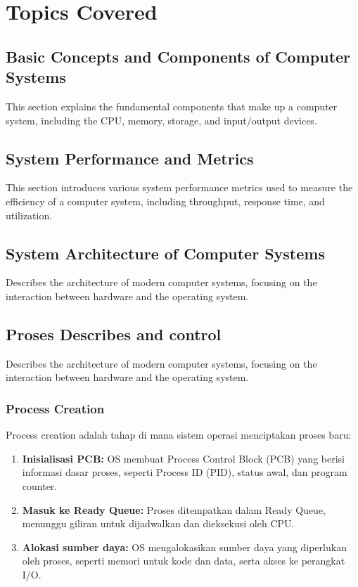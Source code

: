 \documentclass[12pt]{article}
\begin{document}
\section{Topics Covered}

\subsection{Basic Concepts and Components of Computer Systems}
This section explains the fundamental components that make up a computer system, including the CPU, memory, storage, and input/output devices.

\subsection{System Performance and Metrics}
This section introduces various system performance metrics used to measure the efficiency of a computer system, including throughput, response time, and utilization.

\subsection{System Architecture of Computer Systems}
Describes the architecture of modern computer systems, focusing on the interaction between hardware and the operating system.

\subsection{Proses Describes and control}
Describes the architecture of modern computer systems, focusing on the interaction between hardware and the operating system.

\subsubsection{Process Creation}
Process creation adalah tahap di mana sistem operasi menciptakan proses baru:
\begin{enumerate}
    \item \textbf{Inisialisasi PCB:} OS membuat Process Control Block (PCB) yang berisi informasi dasar proses, seperti Process ID (PID), status awal, dan program counter.
    \item \textbf{Masuk ke Ready Queue:} Proses ditempatkan dalam Ready Queue, menunggu giliran untuk dijadwalkan dan dieksekusi oleh CPU.
    \item \textbf{Alokasi sumber daya:} OS mengalokasikan sumber daya yang diperlukan oleh proses, seperti memori untuk kode dan data, serta akses ke perangkat I/O.
\end{enumerate}
\end{document}
